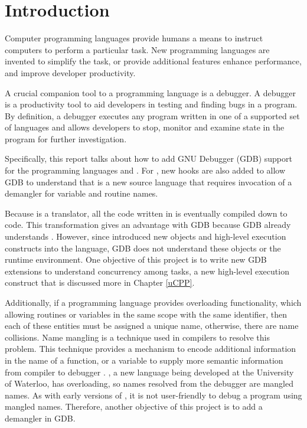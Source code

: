 \chapter{Introduction} \label{introduction}
Computer programming languages provide humans a means to instruct computers to
perform a particular task. New programming languages are
invented to simplify the task, or provide additional features enhance
performance, and improve developer productivity.

A crucial companion tool to a programming language is a debugger. A debugger is a productivity tool to aid developers in testing
and finding bugs in a program. By definition, a debugger executes
any program written in one of a supported set of languages and allows developers
to stop, monitor and examine state in the program for further investigation.

Specifically, this report talks about how to add GNU Debugger (GDB) support for the
programming languages \uCPPS and \CFA.
For \CFA, new hooks are also added to allow GDB to understand that
\CFAS is a new source language that requires invocation of a demangler for
variable and routine names.

Because \uCPPS is a translator, all the code written in \uCPPS is eventually
compiled down to \CCS code. This transformation gives \uCPPS an advantage with
GDB because GDB already understands \CC. However, since \uCPPS introduced new objects
and high-level execution constructs into the language, GDB does not understand
these objects or the runtime environment. One objective of this
project is to write new GDB extensions to understand concurrency among tasks, a new high-level execution construct that is discussed more in Chapter \ref{uCPP}.

Additionally, if a programming language provides overloading functionality,
which allowing routines or variables in the same scope with the
same identifier, then each of these entities must be assigned a unique name, otherwise,
there are name collisions.
Name mangling is a technique used in compilers to resolve this
problem. This technique provides a mechanism to encode additional information in the
name of a function, or a variable to supply more semantic information from
compiler to debugger \cite{reference9}. \CFA, a new language being developed at the University of
Waterloo, has overloading, so names resolved from
the debugger are mangled names. As with early versions of \CC, it is not user-friendly to debug a program using
mangled names. Therefore, another objective of this project is to add a \CFAS demangler in GDB.
